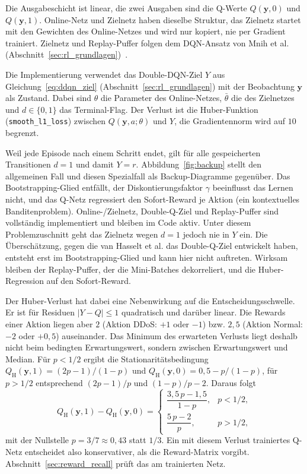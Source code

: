 Die Ausgabeschicht ist linear, die zwei Ausgaben sind die Q-Werte $Q(\mathbf{y},0)$ und $Q(\mathbf{y},1)$. Online-Netz und Zielnetz haben dieselbe Struktur, das Zielnetz startet mit den Gewichten des Online-Netzes und wird nur kopiert, nie per Gradient trainiert. Zielnetz und Replay-Puffer folgen dem DQN-Ansatz von Mnih et al. (Abschnitt~\ref{sec:rl_grundlagen})~\autocite{mnihHumanlevelControlDeep2015}.

Die Implementierung verwendet das Double-DQN-Ziel $Y$ aus Gleichung~\eqref{eq:ddqn_ziel} (Abschnitt~\ref{sec:rl_grundlagen}) mit der Beobachtung $\mathbf{y}$ als Zustand. Dabei sind $\theta$ die Parameter des Online-Netzes, $\bar\theta$ die des Zielnetzes und $d\in\{0,1\}$ das Terminal-Flag. Der Verlust ist die Huber-Funktion (\texttt{smooth\_l1\_loss}) zwischen $Q(\mathbf{y},a;\theta)$ und $Y$, die Gradientennorm wird auf $10$ begrenzt.

Weil jede Episode nach einem Schritt endet, gilt für alle gespeicherten Transitionen $d=1$ und damit $Y=r$. Abbildung~\ref{fig:backup} stellt den allgemeinen Fall und diesen Spezialfall als Backup-Diagramme gegenüber. Das Bootstrapping-Glied entfällt, der Diskontierungsfaktor $\gamma$ beeinflusst das Lernen nicht, und das Q-Netz regressiert den Sofort-Reward je Aktion (ein kontextuelles Banditenproblem). Online-/Zielnetz, Double-Q-Ziel und Replay-Puffer sind vollständig implementiert und bleiben im Code aktiv. Unter diesem Problemzuschnitt geht das Zielnetz wegen $d=1$ jedoch nie in $Y$ ein. Die Überschätzung, gegen die van Hasselt et al. das Double-Q-Ziel entwickelt haben, entsteht erst im Bootstrapping-Glied und kann hier nicht auftreten. Wirksam bleiben der Replay-Puffer, der die Mini-Batches dekorreliert, und die Huber-Regression auf den Sofort-Reward.

Der Huber-Verlust hat dabei eine Nebenwirkung auf die Entscheidungsschwelle. Er ist für Residuen $|Y-Q|\le1$ quadratisch und darüber linear. Die Rewards einer Aktion liegen aber $2$ (Aktion DDoS: $+1$ oder $-1$) bzw. $2{,}5$ (Aktion Normal: $-2$ oder $+0{,}5$) auseinander. Das Minimum des erwarteten Verlusts liegt deshalb nicht beim bedingten Erwartungswert, sondern zwischen Erwartungswert und Median. Für $p<1/2$ ergibt die Stationaritätsbedingung $Q_{\mathrm{H}}(\mathbf{y},1)=(2p-1)/(1-p)$ und $Q_{\mathrm{H}}(\mathbf{y},0)=0{,}5-p/(1-p)$, für $p>1/2$ entsprechend $(2p-1)/p$ und $(1-p)/p-2$. Daraus folgt
\begin{equation}
	Q_{\mathrm{H}}(\mathbf{y},1)-Q_{\mathrm{H}}(\mathbf{y},0)=
	\begin{cases}
		\dfrac{3{,}5\,p-1{,}5}{1-p}, & p<1/2,\\[8pt]
		\dfrac{5\,p-2}{p}, & p>1/2,
	\end{cases}
\end{equation}
mit der Nullstelle $p=3/7\approx0{,}43$ statt $1/3$. Ein mit diesem Verlust trainiertes Q-Netz entscheidet also konservativer, als die Reward-Matrix vorgibt. Abschnitt~\ref{sec:reward_recall} prüft das am trainierten Netz.

